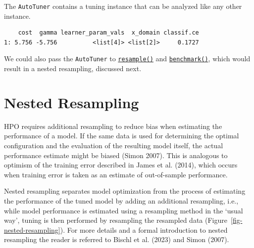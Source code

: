 The \texttt{AutoTuner} contains a tuning instance that can be analyzed
like any other instance.

\begin{Shaded}
\begin{Highlighting}[]
\SpecialCharTok{$}\SpecialCharTok{$}
\end{Highlighting}
\end{Shaded}

\begin{verbatim}
    cost  gamma learner_param_vals  x_domain classif.ce
1: 5.756 -5.756          <list[4]> <list[2]>     0.1727
\end{verbatim}

We could also pass the \texttt{AutoTuner} to
\href{https://mlr3.mlr-org.com/reference/resample.html}{\texttt{resample()}}
and
\href{https://mlr3.mlr-org.com/reference/benchmark.html}{\texttt{benchmark()}},
which would result in a nested resampling, discussed next.

\hypertarget{sec-nested-resampling}{%
\section{Nested Resampling}\label{sec-nested-resampling}}

HPO requires additional resampling to reduce bias when estimating the
performance of a model. If the same data is used for determining the
optimal configuration and the evaluation of the resulting model itself,
the actual performance estimate might be biased (Simon 2007). This is
analogous to optimism of the training
error described in James et al.
(2014), which occurs when training error is taken as an estimate of
out-of-sample performance.

Nested resampling separates model optimization
from the process of estimating the performance of the tuned model by
adding an additional resampling, i.e., while model performance is
estimated using a resampling method in the `usual way', tuning is then
performed by resampling the resampled data
(Figure~\ref{fig-nested-resampling}). For more details and a formal
introduction to nested resampling the reader is referred to Bischl et
al. (2023) and Simon (2007).

